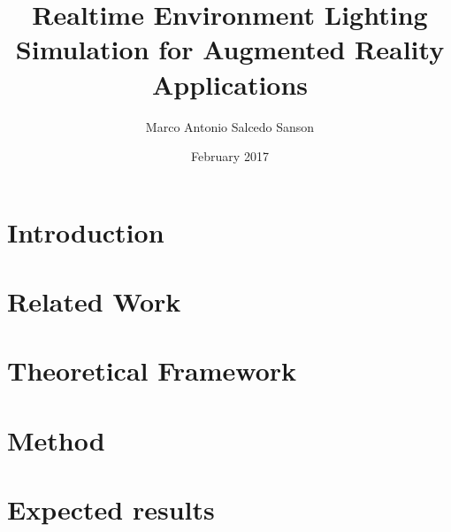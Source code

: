 \documentclass{article}
\title{Realtime Environment Lighting Simulation for Augmented Reality  Applications}
\author{Marco Antonio Salcedo Sanson }
\date{February 2017}
\begin{document}
\maketitle

\section{Introduction}



\section{Related Work}


\section{Theoretical Framework}


\section{Method}


\section{Expected results}


\clearpage


\nocite{*}

\end{document}
